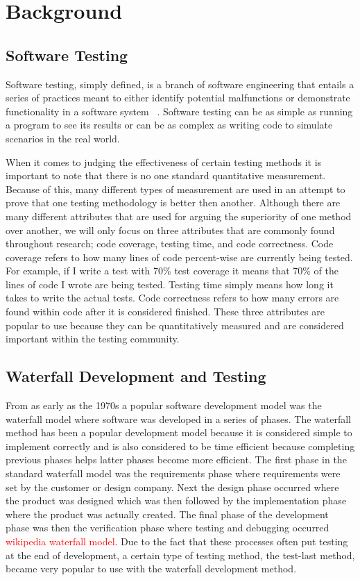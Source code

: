 \documentclass{sig-alternate}
\newcommand{\mycomment}[1]{\textcolor{red}{#1}}
\begin{document}
\section{Background}
\subsection{Software Testing}
Software testing, simply defined, is a branch of software engineering that entails a series of practices meant to either identify potential malfunctions or demonstrate functionality in a software system ~\cite{Bertolino:2007}.  Software testing can be as simple as running a program to see its results or can be as complex as writing code to simulate scenarios in the real world.

When it comes to judging the effectiveness of certain testing methods it is important to note that there is no one standard quantitative measurement.  Because of this, many different types of measurement are used in an attempt to prove that one testing methodology is better then another.  Although there are many different attributes that are used for arguing the superiority of one method over another, we will only focus on three attributes that are commonly found throughout research; code coverage, testing time, and code correctness.  Code coverage refers to how many lines of code percent-wise are currently being tested. For example, if I write a test with 70\% test coverage it means that 70\% of the lines of code I wrote are being tested.  Testing time simply means how long it takes to write the actual tests.  Code correctness refers to how many errors are found within code after it is considered finished.  These three attributes are popular to use because they can be quantitatively measured and are considered important within the testing community. 

\subsection{Waterfall Development and Testing}

From as early as the 1970s a popular software development model was the waterfall model where software was developed in a series of phases.  The waterfall method has been a popular development model because it is considered simple to implement correctly and is also considered to be time efficient because completing previous phases helps latter phases become more efficient. The first phase in the standard waterfall model was the requirements phase where requirements were set by the customer or design company.  Next the design phase occurred where the product was designed which was then followed by the implementation phase where the product was actually created.  The final phase of the development phase was then the verification phase where testing and debugging occurred \mycomment{wikipedia waterfall model}.  Due to the fact that these processes often put testing at the end of development, a certain type of testing method, the test-last method, became very popular to use with the waterfall development method.
\end{document}
